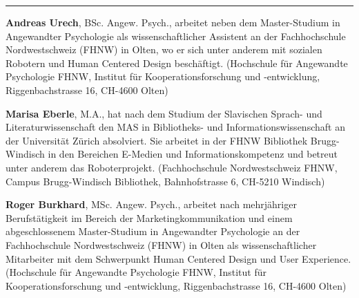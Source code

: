 \begin{center}\rule{0.5\linewidth}{0.5pt}\end{center}

\textbf{Andreas Urech}, BSc. Angew. Psych., arbeitet neben dem
Master-Studium in Angewandter Psychologie als wissenschaftlicher
Assistent an der Fachhochschule Nordwestschweiz (FHNW) in Olten, wo er
sich unter anderem mit sozialen Robotern und Human Centered Design
beschäftigt. (Hochschule für Angewandte Psychologie FHNW, Institut für
Kooperationsforschung und -entwicklung, Riggenbachstrasse 16, CH-4600
Olten)

\textbf{Marisa Eberle}, M.A., hat nach dem Studium der Slavischen
Sprach- und Literaturwissenschaft den MAS in Bibliotheks- und
Informationswissenschaft an der Universität Zürich absolviert. Sie
arbeitet in der FHNW Bibliothek Brugg-Windisch in den Bereichen E-Medien
und Informationskompetenz und betreut unter anderem das Roboterprojekt.
(Fachhochschule Nordwestschweiz FHNW, Campus Brugg-Windisch Bibliothek,
Bahnhofstrasse 6, CH-5210 Windisch)

\textbf{Roger Burkhard}, MSc. Angew. Psych., arbeitet nach mehrjähriger
Berufstätigkeit im Bereich der Marketingkommunikation und einem
abgeschlossenem Master-Studium in Angewandter Psychologie an der
Fachhochschule Nordwestschweiz (FHNW) in Olten als wissenschaftlicher
Mitarbeiter mit dem Schwerpunkt Human Centered Design und User
Experience. (Hochschule für Angewandte Psychologie FHNW, Institut für
Kooperationsforschung und -entwicklung, Riggenbachstrasse 16, CH-4600
Olten)
